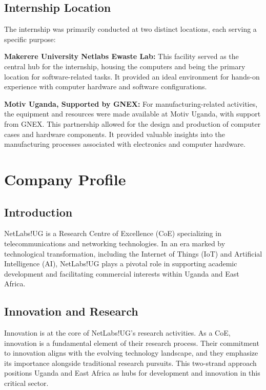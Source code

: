 \subsection{Internship Location}

The internship was primarily conducted at two distinct locations, each serving a specific purpose:

\textbf{Makerere University Netlabs Ewaste Lab:} This facility served as the central hub for the internship, housing the computers and being the primary location for software-related tasks. It provided an ideal environment for hands-on experience with computer hardware and software configurations.

\textbf{Motiv Uganda, Supported by GNEX:} For manufacturing-related activities, the equipment and resources were made available at Motiv Uganda, with support from GNEX. This partnership allowed for the design and production of computer cases and hardware components. It provided valuable insights into the manufacturing processes associated with electronics and computer hardware.

\section{Company Profile}

\subsection{Introduction}

NetLabs!UG is a Research Centre of Excellence (CoE) specializing in telecommunications and networking technologies. In an era marked by technological transformation, including the Internet of Things (IoT) and Artificial Intelligence (AI), NetLabs!UG plays a pivotal role in supporting academic development and facilitating commercial interests within Uganda and East Africa.

\subsection{Innovation and Research}

Innovation is at the core of NetLabs!UG's research activities. As a CoE, innovation is a fundamental element of their research process. Their commitment to innovation aligns with the evolving technology landscape, and they emphasize its importance alongside traditional research pursuits. This two-strand approach positions Uganda and East Africa as hubs for development and innovation in this critical sector.

